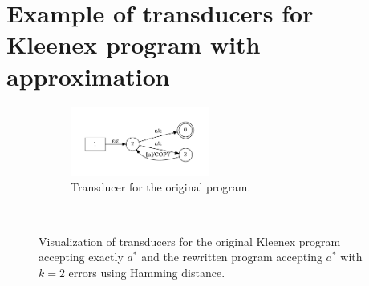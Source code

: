 \section{Example of transducers for Kleenex program with approximation}
\label{app:approx-kleenex-example}

\begin{figure}[!ht]
  \begin{subfigure}[t]{1\textwidth}
    \centering
    \includegraphics[width=0.5\textwidth]{images/as_exact.pdf}
    \caption{Transducer for the original program.}
  \end{subfigure}
  ~
  \noindent{}
  \caption{Visualization of transducers for the original Kleenex program
    accepting exactly $a^*$ and the rewritten program accepting $a^*$ with
    $k=2$ errors using Hamming distance.}
\end{figure}

